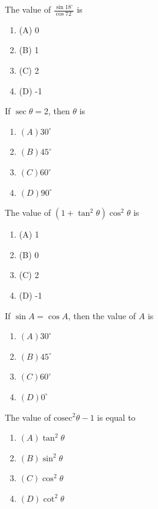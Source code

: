 \documentclass[12pt,a4paper]{exam}
\begin{document}
\begin{questions}
\question[1] The value of $\frac{\sin 18^\circ}{\cos 72^\circ}$ is
\begin{enumerate}[label=(\Alph*)]
  \item (A) 0
  \item (B) 1
  \item (C) 2
  \item (D) -1
\end{enumerate}
\vspace{0.15cm}

\question[1] If $\sec \theta = 2$, then $\theta$ is
\begin{enumerate}[label=(\Alph*)]
  \item $(A) 30^\circ$
  \item $(B) 45^\circ$
  \item $(C) 60^\circ$
  \item $(D) 90^\circ$
\end{enumerate}
\vspace{0.15cm}

\question[1] The value of $(1 + \tan^2 \theta) \cos^2 \theta$ is
\begin{enumerate}[label=(\Alph*)]
  \item (A) 1
  \item (B) 0
  \item (C) 2
  \item (D) -1
\end{enumerate}
\vspace{0.15cm}

\question[1] If $\sin A = \cos A$, then the value of $A$ is
\begin{enumerate}[label=(\Alph*)]
  \item $(A) 30^\circ$
  \item $(B) 45^\circ$
  \item $(C) 60^\circ$
  \item $(D) 0^\circ$
\end{enumerate}
\vspace{0.15cm}

\question[1] The value of $\text{cosec}^2 \theta - 1$ is equal to
\begin{enumerate}[label=(\Alph*)]
  \item $(A) \tan^2 \theta$
  \item $(B) \sin^2 \theta$
  \item $(C) \cos^2 \theta$
  \item $(D) \cot^2 \theta$
\end{enumerate}
\vspace{0.15cm}


\end{questions}
\end{document}

